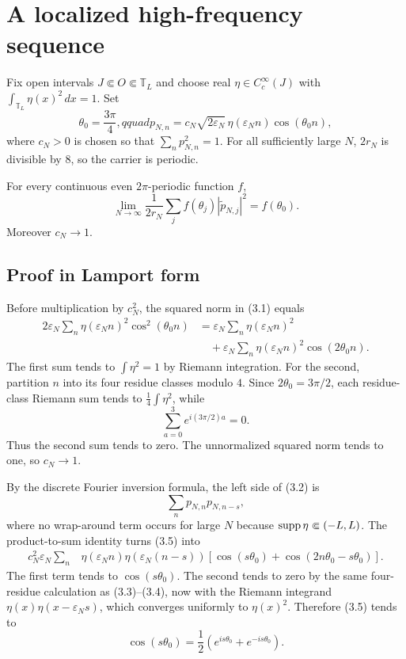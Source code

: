 \documentclass[11pt,a4paper]{article}
\newcommand{\T}{\mathbb T}
\newcommand{\eps}{\varepsilon}
\newcommand{\dd}{\,d}
\begin{document}
\section{A localized high-frequency sequence}\label{sec:carrier}

Fix open intervals $J\Subset O\Subset\T_L$ and choose real
$\eta\in C_c^\infty(J)$ with $\int_{\T_L}\eta(x)^2\dd x=1$.
Set
\[
 \theta_0=\frac{3\pi}{4},qquad
 p_{N,n}=c_N\sqrt{2\eps_N}\,\eta(\eps_Nn)\cos(\theta_0n),        \tag{3.1}
\]
where $c_N>0$ is chosen so that $\sum_n p_{N,n}^2=1$.  For all
sufficiently large $N$, $2r_N$ is divisible by $8$, so the carrier is periodic.

\begin{lemma}\label{lem:carrier}
For every continuous even $2\pi$-periodic function $f$,
\[
 \lim_{N\to\infty}\frac1{2r_N}\sum_j
 f(\theta_j)|\widetilde p_{N,j}|^2=f(\theta_0).                  \tag{3.2}
\]
Moreover $c_N\to1$.
\end{lemma}

\subsection*{Proof in Lamport form}


Before multiplication by $c_N^2$, the squared norm in (3.1) equals
\begin{align}
 2\eps_N\sum_n\eta(\eps_Nn)^2\cos^2(\theta_0n)
 &=\eps_N\sum_n\eta(\eps_Nn)^2\\
 &\quad+\eps_N\sum_n\eta(\eps_Nn)^2\cos(2\theta_0n).           \tag{3.3}
\end{align}
The first sum tends to $\int\eta^2=1$ by Riemann integration.  For the second,
partition $n$ into its four residue classes modulo $4$.  Since
$2\theta_0=3\pi/2$, each residue-class Riemann sum tends to
$\frac14\int\eta^2$, while
\[
 \sum_{a=0}^{3}e^{i(3\pi/2)a}=0.                                \tag{3.4}
\]
Thus the second sum tends to zero.  The unnormalized squared norm tends to one,
so $c_N\to1$.


By the discrete Fourier inversion formula, the left side of (3.2) is
\[
 \sum_np_{N,n}p_{N,n-s},                                        \tag{3.5}
\]
where no wrap-around term occurs for large $N$ because $\operatorname{supp}\eta\Subset(-L,L)$.
The product-to-sum identity turns (3.5) into
\begin{align}
 c_N^2\eps_N\sum_n&\eta(\eps_Nn)\eta(\eps_N(n-s))
 \left[\cos(s\theta_0)+\cos(2n\theta_0-s\theta_0)\right].      \tag{3.6}
\end{align}
The first term tends to $\cos(s\theta_0)$.  The second tends to zero by the same
four-residue calculation as (3.3)--(3.4), now with the Riemann integrand
$\eta(x)\eta(x-\eps_Ns)$, which converges uniformly to $\eta(x)^2$.
Therefore (3.5) tends to
\[
 \cos(s\theta_0)=\frac12(e^{is\theta_0}+e^{-is\theta_0}).       \tag{3.7}
\]
\end{document}
